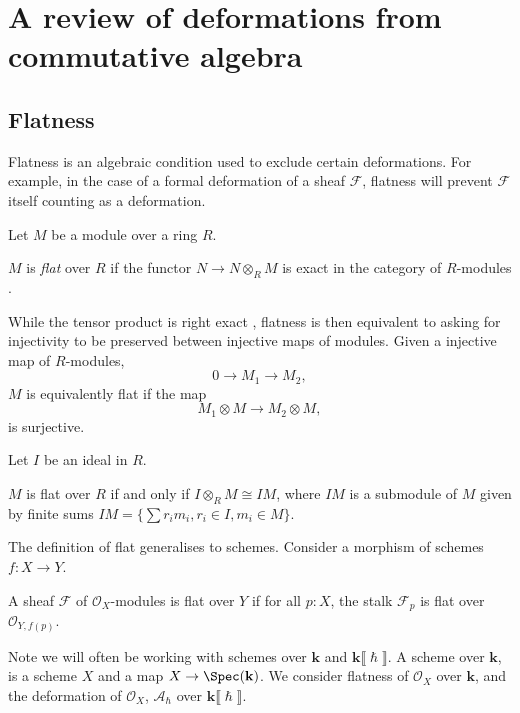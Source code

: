     
    
    
    \section{A review of deformations from commutative algebra}
    
    \subsection{Flatness}
    Flatness is an algebraic condition used to exclude certain deformations. For example, in the case of a formal deformation of a sheaf \( \mathcal{F}\),  flatness will prevent \( \mathcal{F}\) itself counting as a deformation.

    Let \(M\) be a module over a ring \(R\).  
    \begin{defn}[Flat]
    \(M\) is \emph{flat} over \(R\) if the functor \(N \rightarrow N \otimes_R M\) is exact in the category of \(R\)-modules \cite{hartshorne}. 
    \end{defn}
    
    While the tensor product is right exact \cite{},  flatness is then equivalent to asking for injectivity to be preserved between injective maps of modules. Given a injective map of \(R\)-modules,
    \[ 0 \rightarrow M_1 \rightarrow M_2,\]
    \(M\) is equivalently flat if the map
    \[ M_1 \otimes M \rightarrow M_2 \otimes M ,\]
    is surjective.
    
    Let \(I\) be an ideal in \(R\).
    \begin{lem}
    \(M\) is flat over \(R\) if and only if \(I \otimes_R M \cong I M \), where \(I M\) is a submodule of \(M\) given by finite sums \( I M  = \{ \sum r_i m_i, r_i \in I, m_i \in M \} \).
    \end{lem} 
    
    
    The definition of flat generalises to schemes. Consider a morphism of schemes \( f : X \rightarrow Y\). 
    \begin{defn}
    A sheaf \(\mathcal{F}\) of \( \mathcal{O}_X\)-modules is flat over \(Y\) if for all \( p : X\), the stalk \( \mathcal{F}_p\) is flat over \( \mathcal{O}_{Y,f(p)}\).
    \end{defn}
    Note we will often be working with schemes over \( \mathbf{k}\) and \( \mathbf{k}\lBrack \hslash \rBrack\). A scheme over \( \mathbf{k}\), is a scheme \(X\) and a map \( X \rightarrow \Spec(\mathbf{k})\). We consider flatness of \( \mathcal{O}_X\) over \( \mathbf{k}\), and the deformation of \( \mathcal{O}_X\), \( \mathcal{A}_{\hslash} \) over \( \mathbf{k}\lBrack \hslash\rBrack\). 
    
